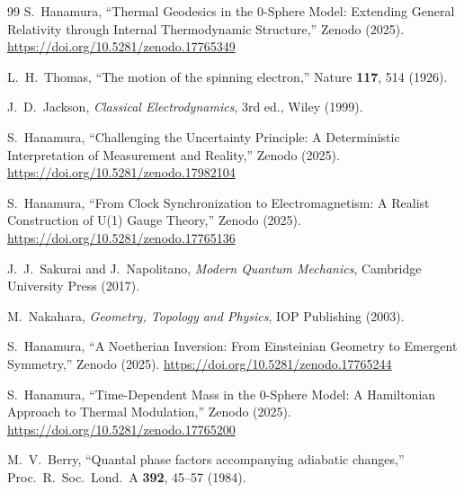 \documentclass[%
 reprint,
 amsmath,amssymb,
 aps,
 prb,
]{revtex4-2}
\numberwithin{equation}{section}
\begin{document}
\begin{thebibliography}{99}
S.~Hanamura,
``Thermal Geodesics in the 0-Sphere Model: Extending General Relativity through Internal Thermodynamic Structure,''
Zenodo (2025).
\href{https://doi.org/10.5281/zenodo.17765349}{https://doi.org/10.5281/zenodo.17765349}

L.~H.~Thomas,
``The motion of the spinning electron,''
Nature \textbf{117}, 514 (1926).

J.~D.~Jackson,
\textit{Classical Electrodynamics},
3rd ed., Wiley (1999).

S.~Hanamura,
``Challenging the Uncertainty Principle: A Deterministic Interpretation of Measurement and Reality,''
Zenodo (2025).
\href{https://doi.org/10.5281/zenodo.17982104}{https://doi.org/10.5281/zenodo.17982104}

S.~Hanamura,
``From Clock Synchronization to Electromagnetism: A Realist Construction of U(1) Gauge Theory,''
Zenodo (2025).
\href{https://doi.org/10.5281/zenodo.17765136}{https://doi.org/10.5281/zenodo.17765136}

J.~J.~Sakurai and J.~Napolitano,
\textit{Modern Quantum Mechanics},
Cambridge University Press (2017).

M.~Nakahara,
\textit{Geometry, Topology and Physics},
IOP Publishing (2003).

S.~Hanamura,
``A Noetherian Inversion: From Einsteinian Geometry to Emergent Symmetry,''
Zenodo (2025).
\href{https://doi.org/10.5281/zenodo.17765244}{https://doi.org/10.5281/zenodo.17765244}

S.~Hanamura,
``Time-Dependent Mass in the 0-Sphere Model: A Hamiltonian Approach to Thermal Modulation,''
Zenodo (2025).
\href{https://doi.org/10.5281/zenodo.17765200}{https://doi.org/10.5281/zenodo.17765200}

M.~V.~Berry,
``Quantal phase factors accompanying adiabatic changes,''
Proc.\ R.\ Soc.\ Lond.\ A {\bf 392}, 45--57 (1984).


\end{thebibliography}
\end{document}
